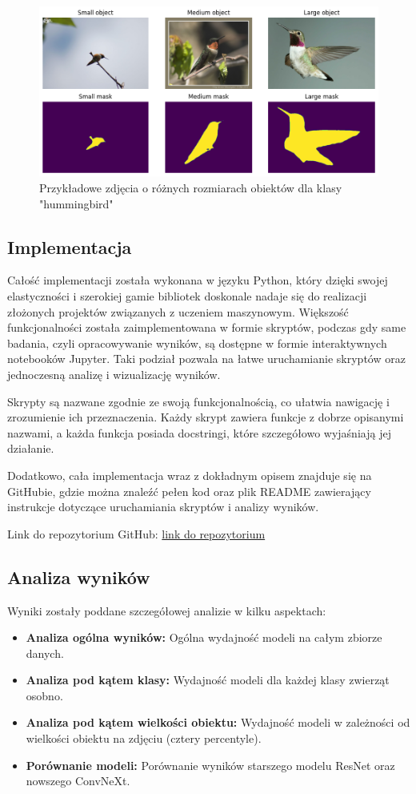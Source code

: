\begin{figure}
	\centering\includegraphics[width=.9\textwidth]{img/size_comp}
	\caption{Przykładowe zdjęcia o różnych rozmiarach obiektów dla klasy "hummingbird"}  \label{rys:size_comp}
\end{figure}

\subsection*{Implementacja}

Całość implementacji została wykonana w języku Python, który dzięki swojej elastyczności i szerokiej 
gamie bibliotek doskonale nadaje się do realizacji złożonych projektów związanych z uczeniem 
maszynowym. Większość funkcjonalności została zaimplementowana w formie skryptów, podczas gdy same 
badania, czyli opracowywanie wyników, są dostępne w formie interaktywnych notebooków Jupyter. Taki 
podział pozwala na łatwe uruchamianie skryptów oraz jednoczesną analizę i wizualizację wyników.

Skrypty są nazwane zgodnie ze swoją funkcjonalnością, co ułatwia nawigację i zrozumienie ich 
przeznaczenia. Każdy skrypt zawiera funkcje z dobrze opisanymi nazwami, a każda funkcja posiada 
docstringi, które szczegółowo wyjaśniają jej działanie.

Dodatkowo, cała implementacja wraz z dokładnym opisem znajduje się na GitHubie, 
gdzie można znaleźć pełen kod oraz plik README zawierający instrukcje dotyczące uruchamiania 
skryptów i analizy wyników. 

Link do repozytorium GitHub: \href{https://github.com/paulpel/BackgroundImpactAnalysis}{link do repozytorium}

\subsection*{Analiza wyników}

Wyniki zostały poddane szczegółowej analizie w kilku aspektach:
\begin{itemize}
    \item \textbf{Analiza ogólna wyników:} Ogólna wydajność modeli na całym zbiorze danych.
    \item \textbf{Analiza pod kątem klasy:} Wydajność modeli dla każdej klasy zwierząt osobno.
    \item \textbf{Analiza pod kątem wielkości obiektu:} Wydajność modeli w zależności od wielkości obiektu na zdjęciu (cztery percentyle).
    \item \textbf{Porównanie modeli:} Porównanie wyników starszego modelu ResNet oraz nowszego ConvNeXt.
\end{itemize}

